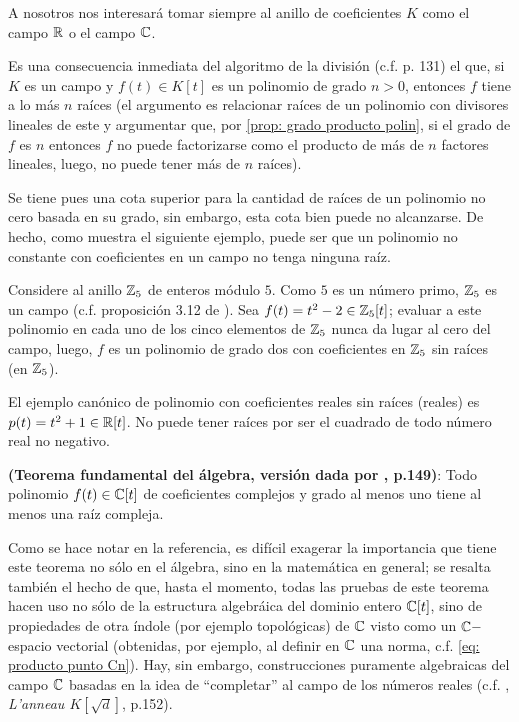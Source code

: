 A nosotros nos interesará tomar siempre al anillo
de coeficientes $K$ como el campo $\mathbb{R}$ o el campo $\mathbb{C}$.

Es una consecuencia inmediata del algoritmo de la división
(c.f. \cite{rotman} p. 131) el que, si $K$ es un campo
y $f(t) \in K[t]$ es un polinomio de grado $n>0$, 
entonces $f$ tiene a lo más $n$ raíces (el argumento es
relacionar raíces de un polinomio con divisores lineales
de este y argumentar que, por 
\ref{prop: grado producto polin}, 
si el grado de $f$
es $n$ entonces $f$ no puede factorizarse como el producto
de más de $n$ factores lineales, luego, no puede tener más de 
$n$ raíces).

Se tiene pues una cota superior para la cantidad
de raíces de un polinomio no cero basada en 
su grado, sin embargo, esta cota bien puede no
alcanzarse. De hecho, como muestra el siguiente ejemplo,
puede ser que un polinomio no constante con coeficientes en un campo
no tenga ninguna raíz.

\begin{ejemplo}
Considere al anillo $\mathbb{Z}_{5}$ de enteros módulo $5$. Como
$5$ es un número primo, $\mathbb{Z}_{5}$ es un campo (c.f. proposición
3.12 de \cite{rotman}).
Sea $f(t)=t^{2}-2 \in \mathbb{Z}_{5}[t]$; evaluar a este polinomio
en cada uno de los cinco elementos de $\mathbb{Z}_{5}$
nunca da lugar al cero del campo, luego, $f$ es un polinomio
de grado dos con coeficientes en $\mathbb{Z}_{5}$ sin raíces
(en $\mathbb{Z}_{5}$).
\final
\end{ejemplo}

\begin{ejemplo}
El ejemplo canónico de polinomio con coeficientes reales
sin raíces (reales) es $p(t)=t^{2}+1 \in \mathbb{R}[t]$. 
No puede tener raíces por
ser el cuadrado de todo número real no negativo. 
\final 
\end{ejemplo}



\begin{teo}
\label{teo: fundamental del algebra}
\textbf{(Teorema fundamental del álgebra, 
versión dada por \cite{kurosch}, p.149)}:
Todo polinomio
$f(t) \in \mathbb{C}[t]$ de coeficientes complejos
y grado al menos uno
tiene al menos una raíz compleja.
\end{teo}

Como se hace notar en la referencia, es difícil exagerar
la importancia que tiene este teorema no sólo en el álgebra, 
sino en la matemática en general; se resalta también el hecho
de que, hasta el momento, todas las pruebas de este teorema
hacen uso no sólo de la estructura algebráica del dominio entero
$\mathbb{C}[t]$, sino de propiedades
de otra índole (por ejemplo
topológicas) de
$\mathbb{C}$ visto como un $\mathbb{C}-$espacio vectorial
(obtenidas, por ejemplo, al definir en $\mathbb{C}$ una norma, c.f.
\eqref{eq: producto punto Cn}).
Hay, sin embargo, construcciones puramente algebraicas
del campo $\mathbb{C}$ basadas en la idea de ``completar'' al campo
de los números reales (c.f. \cite{godement}, 
\textit{L'anneau $K[\sqrt{d}]$}, p.152).


